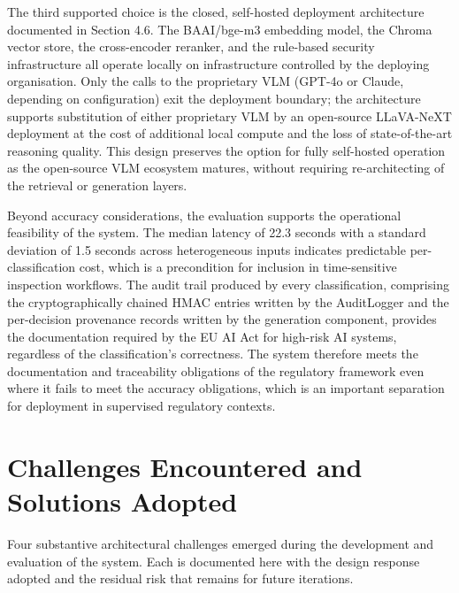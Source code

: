 The third supported choice is the closed, self-hosted deployment architecture documented in Section 4.6. The BAAI/bge-m3 embedding model, the Chroma vector store, the cross-encoder reranker, and the rule-based security infrastructure all operate locally on infrastructure controlled by the deploying organisation. Only the calls to the proprietary VLM (GPT-4o or Claude, depending on configuration) exit the deployment boundary; the architecture supports substitution of either proprietary VLM by an open-source LLaVA-NeXT deployment at the cost of additional local compute and the loss of state-of-the-art reasoning quality. This design preserves the option for fully self-hosted operation as the open-source VLM ecosystem matures, without requiring re-architecting of the retrieval or generation layers.

Beyond accuracy considerations, the evaluation supports the operational feasibility of the system. The median latency of 22.3 seconds with a standard deviation of 1.5 seconds across heterogeneous inputs indicates predictable per-classification cost, which is a precondition for inclusion in time-sensitive inspection workflows. The audit trail produced by every classification, comprising the cryptographically chained HMAC entries written by the AuditLogger and the per-decision provenance records written by the generation component, provides the documentation required by the EU AI Act for high-risk AI systems, regardless of the classification's correctness. The system therefore meets the documentation and traceability obligations of the regulatory framework even where it fails to meet the accuracy obligations, which is an important separation for deployment in supervised regulatory contexts.

\hypertarget{challenges-encountered-and-solutions-adopted}{%
\section{Challenges Encountered and Solutions Adopted}\label{challenges-encountered-and-solutions-adopted}}

Four substantive architectural challenges emerged during the development and evaluation of the system. Each is documented here with the design response adopted and the residual risk that remains for future iterations.

